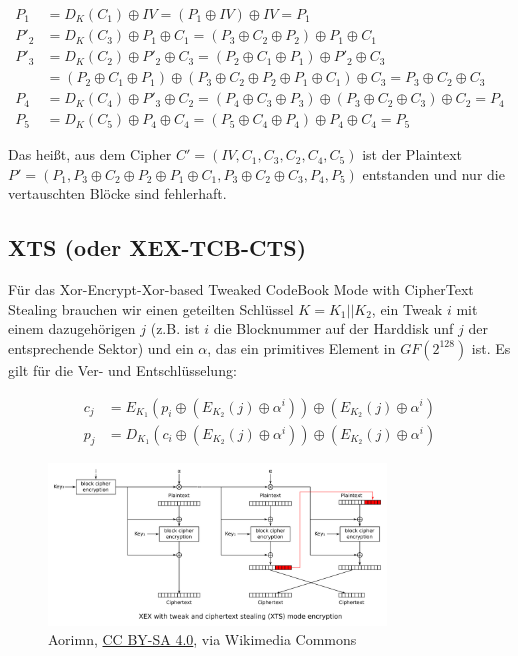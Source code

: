 \begin{align*}
    P_1 &= D_K(C_1) \oplus IV = (P_1 \oplus IV) \oplus IV = P_1 \\
    P'_2 &= D_K(C_3) \oplus P_1 \oplus C_1 = (P_3 \oplus C_2 \oplus P_2) \oplus P_1 \oplus C_1 \\
    P'_3 &= D_K(C_2) \oplus P'_2 \oplus C_3 = (P_2 \oplus C_1 \oplus P_1) \oplus P'_2 \oplus C_3 \\
         &= (P_2 \oplus C_1 \oplus P_1) \oplus (P_3 \oplus C_2 \oplus P_2 \oplus P_1 \oplus C_1) \oplus C_3 = P_3 \oplus C_2 \oplus C_3\\
    P_4 &= D_K(C_4) \oplus P'_3 \oplus C_2 = (P_4 \oplus C_3 \oplus P_3) \oplus (P_3 \oplus C_2 \oplus C_3) \oplus C_2 = P_4\\
    P_5 &= D_K(C_5) \oplus P_4 \oplus C_4 = (P_5 \oplus C_4 \oplus P_4) \oplus P_4 \oplus C_4 = P_5
\end{align*}

Das heißt, aus dem Cipher $C' = (IV, C_1, C_3, C_2, C_4, C_5)$ ist der Plaintext 
$P' = (P_1, P_3 \oplus C_2 \oplus P_2 \oplus P_1 \oplus C_1,  P_3 \oplus C_2 \oplus C_3, P_4, P_5)$ entstanden und nur die vertauschten Blöcke sind fehlerhaft.

\subsection{XTS (oder XEX-TCB-CTS)}

Für das Xor-Encrypt-Xor-based Tweaked CodeBook Mode with CipherText Stealing brauchen wir einen geteilten Schlüssel $K = K_1 || K_2$, ein Tweak $i$ mit einem dazugehörigen 
$j$ (z.B. ist $i$ die Blocknummer auf der Harddisk unf $j$ der entsprechende Sektor) und ein $\alpha$, das ein primitives Element in $GF(2^{128})$ ist. 
Es gilt für die Ver- und Entschlüsselung:

\begin{align*}
    c_j &= E_{K_1}\left(p_i \oplus (E_{K_2}(j) \oplus \alpha^i)\right) \oplus \left(E_{K_2}(j) \oplus \alpha^i\right) \\
    p_j &= D_{K_1}\left(c_i \oplus (E_{K_2}(j) \oplus \alpha^i)\right) \oplus \left(E_{K_2}(j) \oplus \alpha^i\right)
\end{align*}

\begin{figure}[h]
    \includegraphics[width=0.8\textwidth]{figures/fig2-XTS_mode_encryption}
    \centering
    \caption{Aorimn, \href{https://creativecommons.org/licenses/by-sa/4.0}{CC BY-SA 4.0}, via Wikimedia Commons}
\end{figure}


